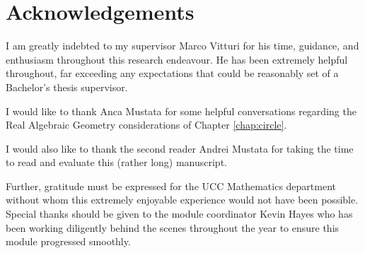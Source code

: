 \section*{Acknowledgements}
I am greatly indebted to my supervisor Marco Vitturi
for his time, guidance, and enthusiasm throughout this research endeavour.
He has been extremely helpful throughout, far exceeding any expectations that could be reasonably set of a Bachelor's thesis supervisor.

I would like to thank Anca Mustata for some helpful conversations regarding the Real Algebraic Geometry considerations of Chapter \ref*{chap:circle}.

I would also like to thank the second reader Andrei Mustata for taking the time to read and evaluate this (rather long) manuscript. 

Further, gratitude must be expressed for the UCC Mathematics department without whom this extremely enjoyable experience would not have been possible.
Special thanks should be given to the module coordinator Kevin Hayes who has been working diligently behind the scenes throughout the year to ensure this module progressed smoothly.